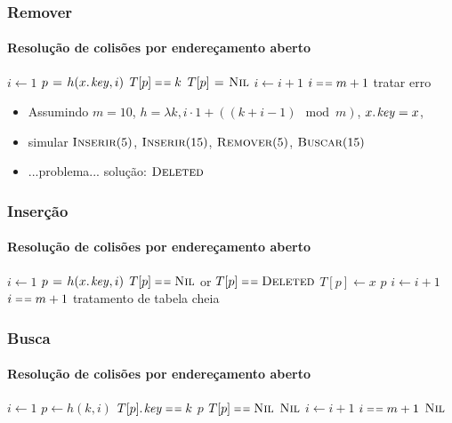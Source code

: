 \documentclass{beamer}
\begin{document}
\begin{frame}

\frametitle{Remover}
\framesubtitle{Resolução de colisões por endereçamento aberto}

\begin{codebox}
    \li $i \gets 1$
    \li \Repeat 
    \li   $p \gets h(\attrib{x}{key}, i)$ 
    \li   \If $T[p] \isequal k$
    \li   \Then $T[p] \mathrel{\hspace{1pt}=\hspace{1pt}} \textnormal{\scshape Nil}$
                \Return
          \End
    \li   $i \gets i+1$
          \End
    \li \Until $i \isequal m+1$
    \li \Comment tratar erro 
\end{codebox}

\pause

\begin{itemize}

\item Assumindo $m = 10$, $h = \lambda k, i \cdot 1 + ((k + i - 1) \mod m)$, $\attrib{x}{key} = x$,
\item simular $\textnormal{\scshape Inserir}(5)$, $\textnormal{\scshape Inserir}(15)$, $\textnormal{\scshape Remover}(5)$, $\textnormal{\scshape Buscar}(15)$
\pause
\item \alert{...problema...} \pause solução: $\textnormal{\scshape Deleted}$
\end{itemize}
\end{frame}

\begin{frame}

\frametitle{Inserção}
\framesubtitle{Resolução de colisões por endereçamento aberto}

\begin{codebox}
    \li $i \gets 1$
    \li \Repeat 
    \li   $p \gets h(\attrib{x}{key}, i)$ 
    \li   \If $T[p] \isequal \const{Nil}$ or $T[p] \isequal \const{Deleted}$
    \li   \Then $T[p] \gets x$
    \li     \Return $p$
    \li   \Else $i \gets i+1$
          \End
    \li \Until $i \isequal m+1$
    \li \Comment tratamento de tabela cheia
\end{codebox}

\end{frame}

\begin{frame}

\frametitle{Busca}
\framesubtitle{Resolução de colisões por endereçamento aberto}

\begin{codebox}
    \li $i \gets 1$
    \li \Repeat 
    \li   $p \gets h(k, i)$ 
    \li   \If $\attrib{T[p]}{key} \isequal k$
    \li   \Then \Return $p$
          \End
    \li   \If $T[p] \isequal \const{Nil}$
    \li   \Then \Return $\textnormal{\scshape Nil}$
          \End
    \li   $i \gets i+1$
          \End
    \li \Until $i \isequal m+1$
    \li \Return $\textnormal{\scshape Nil}$
\end{codebox}

\end{frame}
\end{document}
